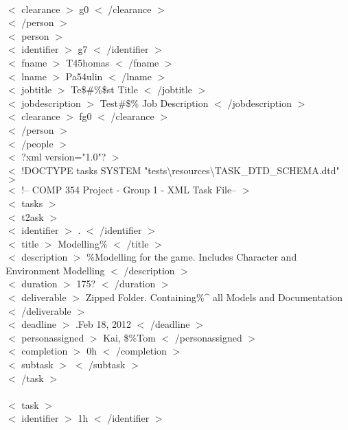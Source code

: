 \documentclass[12pt]{article}
\newcommand{\tab}{\hspace*{2em}}
\begin{document}
{\\ \tab\tab $<$ clearance $>$ g0 $<$ /clearance $>$ 
\\ \tab$<$ /person $>$ 
\\ \tab$<$ person $>$ 
\\ \tab\tab $<$ identifier $>$ g7 $<$ /identifier $>$ 
\\ \tab\tab $<$ fname $>$ T45homas $<$ /fname $>$ 
\\ \tab\tab $<$ lname $>$ Pa54ulin $<$ /lname $>$ 
\\ \tab\tab $<$ jobtitle $>$ Te\$\#\%\$st Title $<$ /jobtitle $>$ 
\\ \tab\tab $<$ jobdescription $>$ Test\#\$\% Job Description $<$ /jobdescription $>$ 
\\ \tab\tab $<$ clearance $>$ fg0 $<$ /clearance $>$ 
\\ \tab$<$ /person $>$ 
\\ $<$ /people $>$ 
\\ $<$ ?xml version="1.0"? $>$ 
\\ $<$ !DOCTYPE tasks SYSTEM "tests\textbackslash resources\textbackslash TASK\_DTD\_SCHEMA.dtd" $>$ 
\\ $<$ !-- COMP 354 Project - Group 1 - XML Task File-- $>$ 
\\ $<$ tasks $>$ 
\\ \tab$<$ t2ask $>$ 
\\ \tab    \tab $<$ identifier $>$ . $<$ /identifier $>$ 
\\ \tab    \tab $<$ title $>$ Modelling\% $<$ /title $>$ 
\\ \tab    \tab $<$ description $>$ \-\%Modelling for the game. Includes Character and Environment Modelling $<$ /description $>$ 
\\ \tab    \tab $<$ duration $>$ 175? $<$ /duration $>$ 
\\ \tab    \tab $<$ deliverable $>$ Zipped Folder. Containing\%\^{} all Models and Documentation $<$ /deliverable $>$ 
\\ \tab    \tab $<$ deadline $>$ .Feb 18, 2012 $<$ /deadline $>$ 
\\ \tab    \tab $<$ personassigned $>$ Kai, \$\%Tom $<$ /personassigned $>$ 
\\ \tab    \tab $<$ completion $>$ 0h $<$ /completion $>$ 
\\ \tab    \tab $<$ subtask $>$  $<$ /subtask $>$ 
\\ \tab$<$ /task $>$ 
\\ 
\\ \tab$<$ task $>$ 
\\ \tab    \tab $<$ identifier $>$ 1h $<$ /identifier $>$ 
}
\end{document}
